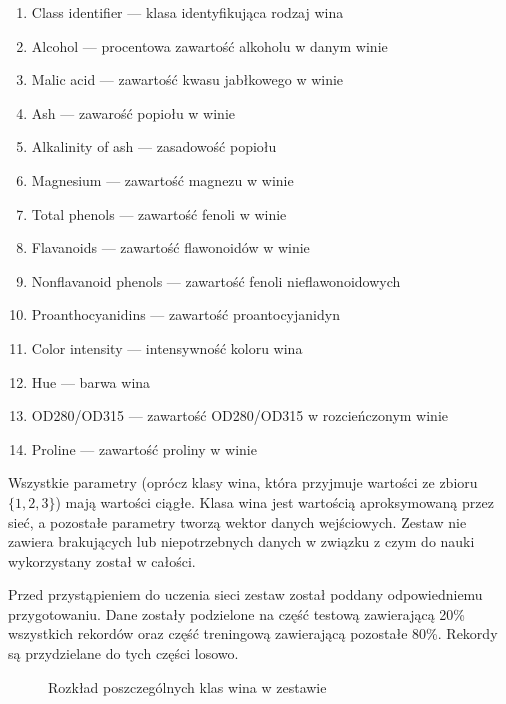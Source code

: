 \documentclass[a4paper,12pt]{article}
\numberwithin{equation}{section}
\begin{document}
\begin{enumerate}
    \item Class identifier — klasa identyfikująca rodzaj wina
    \item Alcohol — procentowa zawartość alkoholu w danym winie
    \item Malic acid — zawartość kwasu jabłkowego w winie
    \item Ash — zawarość popiołu w winie
    \item Alkalinity of ash — zasadowość popiołu
    \item Magnesium — zawartość magnezu w winie
    \item Total phenols — zawartość fenoli w winie
    \item Flavanoids — zawartość flawonoidów w winie
    \item Nonflavanoid phenols — zawartość fenoli nieflawonoidowych
    \item Proanthocyanidins — zawartość proantocyjanidyn
    \item Color intensity — intensywność koloru wina
    \item Hue — barwa wina
    \item OD280/OD315 — zawartość OD280/OD315 w rozcieńczonym winie
    \item Proline — zawartość proliny w winie
\end{enumerate}

Wszystkie parametry (oprócz klasy wina, która przyjmuje wartości ze zbioru $\{1, 2, 3\}$) mają wartości ciągłe. Klasa wina jest wartością aproksymowaną przez sieć, a pozostałe parametry tworzą wektor danych wejściowych. Zestaw nie zawiera brakujących lub niepotrzebnych danych w związku z czym do nauki wykorzystany został w całości.

Przed przystąpieniem do uczenia sieci zestaw został poddany odpowiedniemu przygotowaniu. Dane zostały podzielone na część testową zawierającą 20\% wszystkich rekordów oraz część treningową zawierającą pozostałe 80\%. Rekordy są przydzielane do tych części losowo.

\begin{figure}[h]
    \vspace{0.5cm}
    \centering
    \label{fig:wine_class_chart}


    \caption{Rozkład poszczególnych klas wina w zestawie}
    \vspace{0.5cm}
\end{figure}
\end{document}
